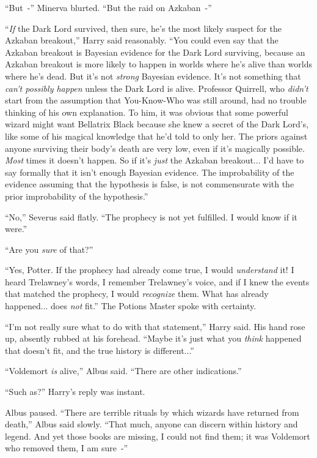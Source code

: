 ``But~-'' Minerva blurted. ``But the raid on Azkaban~-''

``\emph{If} the Dark Lord survived, then sure, he's the most likely suspect for the Azkaban breakout,'' Harry said reasonably. ``You could even say that the Azkaban breakout is Bayesian evidence for the Dark Lord surviving, because an Azkaban breakout is more likely to happen in worlds where he's alive than worlds where he's dead. But it's not \emph{strong} Bayesian evidence. It's not something that \emph{can't possibly happen} unless the Dark Lord is alive. Professor Quirrell, who \emph{didn't} start from the assumption that You-Know-Who was still around, had no trouble thinking of his own explanation. To him, it was obvious that some powerful wizard might want Bellatrix Black because she knew a secret of the Dark Lord's, like some of his magical knowledge that he'd told to only her. The priors against anyone surviving their body's death are very low, even if it's magically possible. \emph{Most} times it doesn't happen. So if it's \emph{just} the Azkaban breakout... I'd have to say formally that it isn't enough Bayesian evidence. The improbability of the evidence assuming that the hypothesis is false, is not commensurate with the prior improbability of the hypothesis.''

``No,'' Severus said flatly. ``The prophecy is not yet fulfilled. I would know if it were.''

``Are you \emph{sure} of that?''

``Yes, Potter. If the prophecy had already come true, I would \emph{understand} it! I heard Trelawney's words, I remember Trelawney's voice, and if I knew the events that matched the prophecy, I would \emph{recognize} them. What has already happened... does \emph{not} fit.'' The Potions Master spoke with certainty.

``I'm not really sure what to do with that statement,'' Harry said. His hand rose up, absently rubbed at his forehead. ``Maybe it's just what you \emph{think} happened that doesn't fit, and the true history is different...''

``Voldemort \emph{is} alive,'' Albus said. ``There are other indications.''

``Such as?'' Harry's reply was instant.

Albus paused. ``There are terrible rituals by which wizards have returned from death,'' Albus said slowly. ``That much, anyone can discern within history and legend. And yet those books are missing, I could not find them; it was Voldemort who removed them, I am sure~-''

